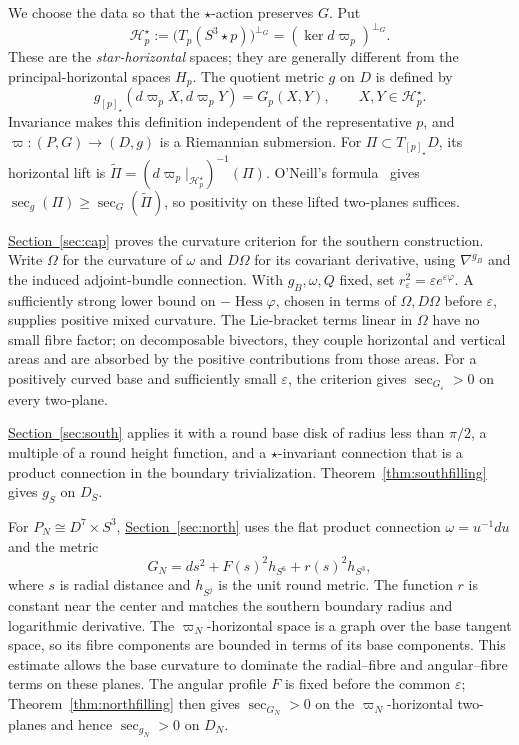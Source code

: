 \documentclass[12pt]{amsart}
\numberwithin{equation}{section}
\theoremstyle{remark}
\newcommand{\eps}{\varepsilon}
\newcommand{\Hess}{\operatorname{Hess}}
\newcommand{\Ksec}{\operatorname{sec}}
\begin{document}
We choose the data so that the \(\star\)-action preserves \(G\).
Put
\[
 \mathcal H^\star_p:=\bigl(T_p(S^3\star p)\bigr)^{\perp_G}
                       =(\ker d\varpi_p)^{\perp_G}.
\]
These are the \emph{star-horizontal} spaces; they are generally
different from the principal-horizontal spaces \(H_p\).
The quotient metric \(g\) on \(D\) is defined by
\[
 g_{[p]_\star}(d\varpi_pX,d\varpi_pY)=G_p(X,Y),
 \qquad X,Y\in\mathcal H^\star_p.
\]
Invariance makes this definition independent of the representative
\(p\), and \(\varpi:(P,G)\to(D,g)\) is a Riemannian submersion.
For \(\Pi\subset T_{[p]_\star}D\), its horizontal lift is
\(\widetilde\Pi=(d\varpi_p|_{\mathcal H^\star_p})^{-1}(\Pi)\).
O'Neill's formula~\cite{ON} gives
\(\Ksec_g(\Pi)\ge\Ksec_G(\widetilde\Pi)\), so positivity on these
lifted two-planes suffices.

\hyperref[sec:cap]{Section~\ref*{sec:cap}} proves the curvature criterion for the
southern construction. Write \(\Omega\) for the curvature of
\(\omega\) and \(D\Omega\) for its covariant derivative, using
\(\nabla^{g_B}\) and the induced adjoint-bundle connection.
With \(g_B,\omega,Q\) fixed, set
\(r_\eps^2=\eps e^{\eps\varphi}\). A sufficiently strong lower bound on
\(-\Hess\varphi\), chosen in terms of \(\Omega,D\Omega\) before
\(\eps\), supplies positive mixed curvature. The Lie-bracket
terms linear in \(\Omega\) have no small fibre factor; on
decomposable bivectors, they couple horizontal and vertical areas
and are absorbed by the positive contributions from those areas.
For a positively curved base and sufficiently small \(\eps\),
the criterion gives \(\Ksec_{G_\eps}>0\) on every two-plane.

\hyperref[sec:south]{Section~\ref*{sec:south}} applies it with a round base disk of radius
less than \(\pi/2\), a multiple of a round height function, and
a \(\star\)-invariant connection that is a product connection in
the boundary trivialization. Theorem~\ref{thm:southfilling} gives
\(g_S\) on \(D_S\).

For \(P_N\cong D^7\times S^3\), \hyperref[sec:north]{Section~\ref*{sec:north}} uses the
flat product connection \(\omega=u^{-1}du\) and the metric
\[
 G_N=ds^2+F(s)^2h_{S^6}+r(s)^2h_{S^3},
\]
where \(s\) is radial distance and \(h_{S^j}\) is the unit round
metric. The function \(r\) is constant near the center and matches
the southern boundary radius and logarithmic derivative. The
\(\varpi_N\)-horizontal space is a graph over the base tangent
space, so its fibre components are bounded in terms of its base
components. This estimate allows the base curvature to dominate
the radial--fibre and angular--fibre terms on these planes.
The angular profile \(F\) is fixed before the common \(\eps\);
Theorem~\ref{thm:northfilling} then gives \(\Ksec_{G_N}>0\)
on the \(\varpi_N\)-horizontal two-planes and hence
\(\Ksec_{g_N}>0\) on \(D_N\).
\end{document}
